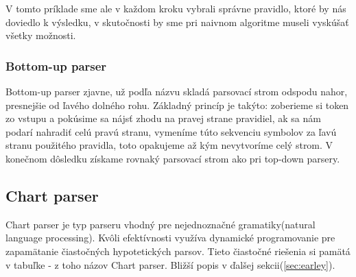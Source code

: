 \documentclass[12pt,a4paper]{report}
\theoremstyle{definition}
\theoremstyle{remark}
\newcommand\tab[1][1cm]{\hspace*{#1}}
\begin{document}
%


V tomto príklade sme ale v každom kroku vybrali správne pravidlo, ktoré by nás doviedlo k výsledku, v skutočnosti by sme pri naivnom algoritme museli vyskúšať všetky možnosti.

\subsubsection*{Bottom-up parser} 

Bottom-up parser zjavne, už podľa názvu skladá parsovací strom odspodu nahor, presnejšie od ľavého dolného rohu. Základný princíp je takýto: zoberieme si token zo vstupu a pokúsime sa nájsť zhodu na pravej strane pravidiel, ak sa nám podarí nahradiť celú pravú stranu, vymeníme túto sekvenciu symbolov za ľavú stranu použitého pravidla, toto opakujeme až kým nevytvoríme celý strom. V konečnom dôsledku získame rovnaký parsovací strom ako pri top-down parsery.

\subsection{Chart parser} 
Chart parser je typ parseru vhodný pre nejednoznačné gramatiky(natural language processing). Kvôli efektívnosti využíva dynamické programovanie pre zapamätanie čiastočných hypotetických parsov. Tieto čiastočné riešenia si pamätá v tabuľke - z toho názov Chart parser. Bližší popis v ďalšej sekcii(\ref{sec:earley}).
\end{document}
